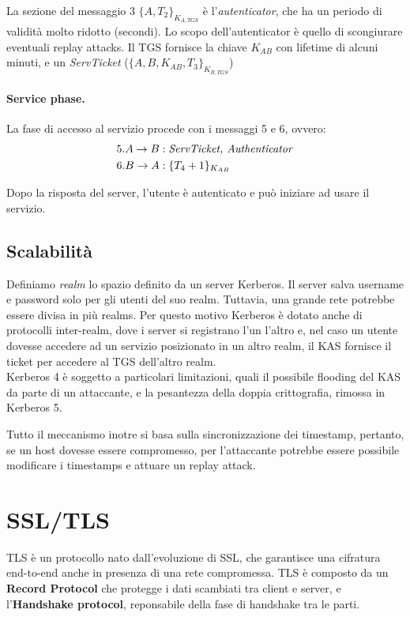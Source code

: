 \documentclass[a4paper, 10pt, twoside]{article}
\begin{document}
	La sezione del messaggio 3 $\lbrace A, T_2\rbrace_{K_{A, TGS}}$ è l'\textit{autenticator}, che ha un periodo di validità molto ridotto (secondi). Lo scopo dell'autenticator è quello di scongiurare eventuali replay attacks. Il TGS fornisce la chiave $K_{AB}$ con lifetime di alcuni minuti, e un \textit{ServTicket} ($\lbrace A, B, K_{AB}, T_3\rbrace_{K_{B, TGS}}$)

	\paragraph{Service phase.} La fase di accesso al servizio procede con i messaggi 5 e 6, ovvero: \begin{align*}
		5. A \to B&: \text{\textit{ServTicket, Authenticator}}\\
		6. B \to A&: \lbrace T_4 + 1\rbrace_{K_{AB}}
	\end{align*}

	Dopo la risposta del server, l'utente è autenticato e può iniziare ad usare il servizio.

	\subsection{Scalabilità}
	Definiamo \textit{realm} lo spazio definito da un server Kerberos. Il server salva username e password solo per gli utenti del suo realm. Tuttavia, una grande rete potrebbe essere divisa in più realms. Per questo motivo Kerberos è dotato anche di protocolli inter-realm, dove i server si registrano l'un l'altro e, nel caso un utente dovesse accedere ad un servizio posizionato in un altro realm, il KAS fornisce il ticket per accedere al TGS dell'altro realm. \\

	Kerberos 4 è soggetto a particolari limitazioni, quali il possibile flooding del KAS da parte di un attaccante, e la pesantezza della doppia crittografia, rimossa in Kerberos 5.

	Tutto il meccanismo inotre si basa sulla sincronizzazione dei timestamp, pertanto, se un host dovesse essere compromesso, per l'attaccante potrebbe essere possibile modificare i timestamps e attuare un replay attack.

	\section{SSL/TLS}
	TLS è un protocollo nato dall'evoluzione di SSL, che garantisce una cifratura end-to-end anche in presenza di una rete compromessa. TLS è composto da un \textbf{Record Protocol} che protegge i dati scambiati tra client e server, e l'\textbf{Handshake protocol}, reponsabile della fase di handshake tra le parti.
\end{document}
